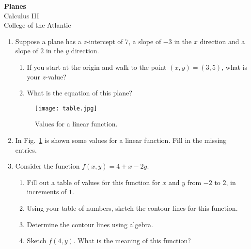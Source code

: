 \documentclass[12pt]{article}
\begin{document}
\pagestyle{empty}

\begin{center}
{\Large {\bf Planes}}\\
\medskip
{\large {Calculus III}}\\
\medskip
College of the Atlantic\\
\end{center}
\smallskip

\begin{enumerate}


\item Suppose a plane has a $z$-intercept of $7$, a slope of $-3$ in
the $x$ direction and a slope of $2$ in the $y$ direction.  
\begin{enumerate}
  \item If you start at the origin and walk to the point $(x,y) =
    (3,5)$, what is your $z$-value? 
  \item What is the equation of this plane?
\end{enumerate}

\begin{figure}[h]
\begin{center}
\vspace{0mm}
\texttt{[image: table.jpg]}
\vspace{-4mm}
\caption{Values for a linear function.}
\label{fig:table}
\end{center}
\end{figure}
\vspace{-7mm}

\item In Fig.~\ref{fig:table} is shown some values for a linear
  function.  Fill in the missing entries.



\item Consider the function $f(x,y) = 4 + x - 2y$.
\begin{enumerate}
\item Fill out a table of values for this function for $x$ and $y$
  from $-2$ to $2$, in increments of $1$.

\item Using your table of numbers, sketch the contour lines for this
  function.

\item Determine the contour lines using algebra.

\item Sketch $f(4,y)$.  What is the meaning of this function?


\end{enumerate}
\end{enumerate}
\end{document}
